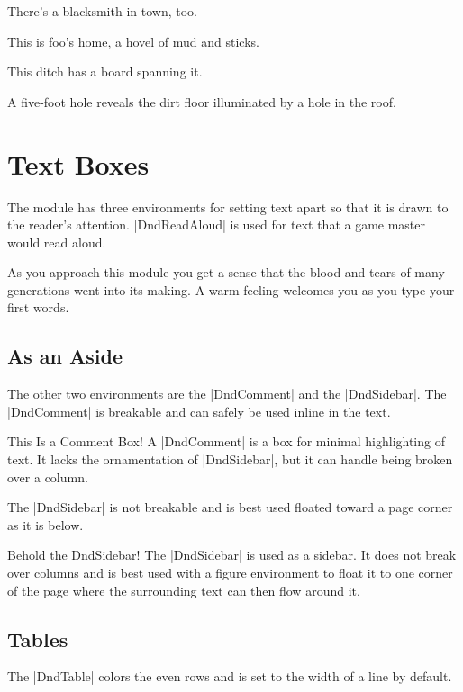 \documentclass[letterpaper,twocolumn,openany,nodeprecatedcode]{dndbook}
\begin{document}
There's a blacksmith in town, too.

This is foo's home, a hovel of mud and sticks.

This ditch has a board spanning it.

A five-foot hole reveals the dirt floor illuminated by a hole in the roof.

\chapter{Text Boxes}

The module has three environments for setting text apart so that it is drawn to the reader's attention. |DndReadAloud| is used for text that a game master would read aloud.

\begin{DndReadAloud}
	As you approach this module you get a sense that the blood and tears of many generations went into its making. A warm feeling welcomes you as you type your first words.
\end{DndReadAloud}

\section{As an Aside}
The other two environments are the |DndComment| and the |DndSidebar|. The |DndComment| is breakable and can safely be used inline in the text.

\begin{DndComment}{This Is a Comment Box!}
	A |DndComment| is a box for minimal highlighting of text. It lacks the ornamentation of |DndSidebar|, but it can handle being broken over a column.
\end{DndComment}

The |DndSidebar| is not breakable and is best used floated toward a page corner as it is below.

\begin{DndSidebar}[float=!b]{Behold the DndSidebar!}
	The |DndSidebar| is used as a sidebar. It does not break over columns and is best used with a figure environment to float it to one corner of the page where the surrounding text can then flow around it.
\end{DndSidebar}

\section{Tables}
The |DndTable| colors the even rows and is set to the width of a line by default.
\end{document}
